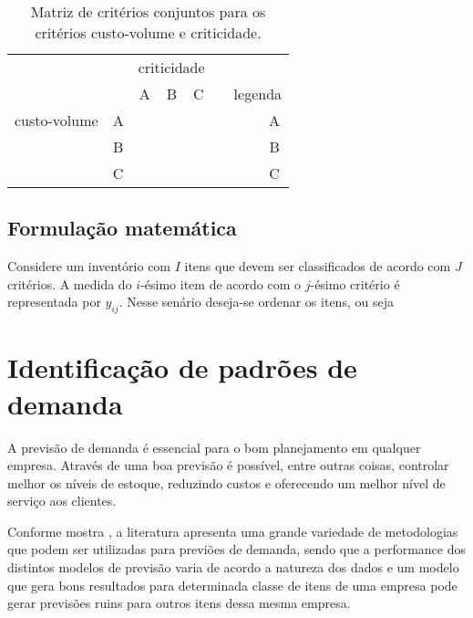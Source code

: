 \documentclass{book}
\begin{document}
\begin{table}[h]
\begin{center}
\begin{tabular}[c]{c c | c | c | c | c c c c}
&\multicolumn{1}{c}{}  & \multicolumn{3}{c}{criticidade} \\ 
 \multirow{3}{*}{\begin{turn}{90} custo-volume \end{turn}} & \multicolumn{1}{c}{} &\multicolumn{1}{c}{A} &\multicolumn{1}{c}{B} & \multicolumn{1}{c}{C} & & \multicolumn{3}{c}{legenda} \\
\cline {3-5}
  & A & \cellcolor{green} & \cellcolor{green} & \multicolumn{1}{|b|}{} & &  & \cellcolor{green} & A \\ 
\cline {3-5}
& B & \cellcolor{green} &  \multicolumn{1}{|b|}{} & \cellcolor{yellow}  & & & \cellcolor{blue} & B \\
\cline {3-5}
& C & \cellcolor{green} &  \cellcolor{blue} & \cellcolor{yellow} & & & \cellcolor{yellow} & C\\ 
\end{tabular}
\label{tab:jointMatrixCVC}
\caption{Matriz de critérios conjuntos para os critérios custo-volume e criticidade.}
\end{center}
\end{table}

\section{Formulação matemática}
\label{mathForm}

Considere um inventório com $I$ itens que devem ser classificados de acordo com $J$ critérios. A medida do $i$-ésimo item de acordo com o $j$-ésimo critério é representada por $y_{ij}$. Nesse senário deseja-se ordenar os itens, ou seja

\chapter{Identificação de padrões de demanda}

A previsão de demanda é essencial para o bom planejamento em qualquer empresa. Através de uma boa previsão é possível, entre outras coisas, controlar melhor os níveis de estoque, reduzindo custos e oferecendo um melhor nível de serviço aos clientes. 

Conforme mostra \cite{MakridakisHibon2000}, a literatura apresenta uma grande variedade de metodologias que podem ser utilizadas para previões de demanda, sendo que a performance dos distintos modelos de previsão varia de acordo a natureza dos dados e um modelo que gera bons resultados para determinada classe de itens de uma empresa pode gerar previsões ruins para outros itens dessa mesma empresa.
\end{document}
